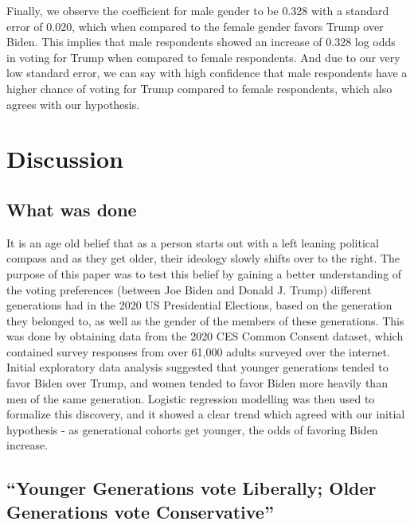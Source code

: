 \documentclass[
  letterpaper,
  DIV=11,
  numbers=noendperiod]{scrartcl}
\begin{document}
Finally, we observe the coefficient for male gender to be 0.328 with a
standard error of 0.020, which when compared to the female gender favors
Trump over Biden. This implies that male respondents showed an increase
of 0.328 log odds in voting for Trump when compared to female
respondents. And due to our very low standard error, we can say with
high confidence that male respondents have a higher chance of voting for
Trump compared to female respondents, which also agrees with our
hypothesis.

\hypertarget{sec-discussion}{%
\section{Discussion}\label{sec-discussion}}

\hypertarget{sec-first-point}{%
\subsection{What was done}\label{sec-first-point}}

It is an age old belief that as a person starts out with a left leaning
political compass and as they get older, their ideology slowly shifts
over to the right. The purpose of this paper was to test this belief by
gaining a better understanding of the voting preferences (between Joe
Biden and Donald J. Trump) different generations had in the 2020 US
Presidential Elections, based on the generation they belonged to, as
well as the gender of the members of these generations. This was done by
obtaining data from the 2020 CES Common Consent dataset, which contained
survey responses from over 61,000 adults surveyed over the internet.
Initial exploratory data analysis suggested that younger generations
tended to favor Biden over Trump, and women tended to favor Biden more
heavily than men of the same generation. Logistic regression modelling
was then used to formalize this discovery, and it showed a clear trend
which agreed with our initial hypothesis - as generational cohorts get
younger, the odds of favoring Biden increase.

\hypertarget{younger-generations-vote-liberally-older-generations-vote-conservative}{%
\subsection{``Younger Generations vote Liberally; Older Generations vote
Conservative''}\label{younger-generations-vote-liberally-older-generations-vote-conservative}}
\end{document}
